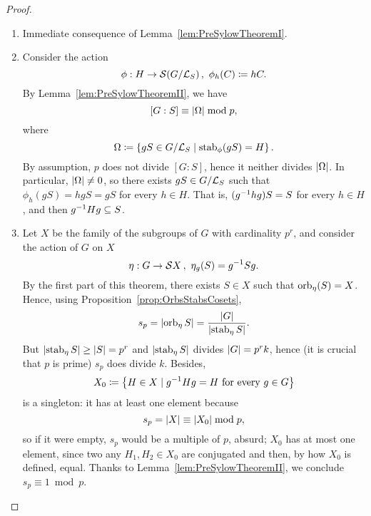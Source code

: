 \begin{proof}
\begin{enumerate}
\item Immediate consequence of Lemma~\ref{lem:PreSylowTheoremI}.
%
\item Consider the action
\[\phi : H \to \mathcal S(G/\mathcal L_S)\,,\ \phi_h (C) \coloneq hC .\]
By Lemma~\ref{lem:PreSylowTheoremII}, we have
\[[G:S] \equiv \left\lvert\Omega\right\rvert \bmod p ,\]
where
\[\Omega \coloneq \left\{gS \in G/\mathcal L_S \mid \operatorname{stab}_\phi (gS) = H\right\} .\]
By assumption, \(p\) does not divide \([G:S]\), hence it neither divides \(\left\lvert\Omega\right\rvert\). In particular, \(\left\lvert\Omega\right\rvert \ne 0\), so there exists \(gS \in G/\mathcal L_S\) such that \(\phi_h(gS) = hgS = gS\) for every \(h \in H\). That is, \((g^{-1} h g) S = S\) for every \(h \in H\), and then \(g^{-1} H g \subseteq S\).
%
\item Let \(X\) be the family of the subgroups of \(G\) with cardinality \(p^r\), and consider the action of \(G\) on \(X\)
\[\eta : G \to \mathcal S X\,, \ \eta_g (S) = g^{-1} S g .\]
By the first part of this theorem, there exists \(S \in X\) such that \(\operatorname{orb}_\eta (S) = X\). Hence, using Proposition~\ref{prop:OrbsStabsCosets},
\[s_p = \left\lvert\operatorname{orb}_\eta S\right\rvert = \frac{\left\lvert G\right\rvert}{\left\lvert\operatorname{stab}_\eta S\right\rvert}.\]
But \(\left\lvert\operatorname{stab}_\eta S\right\rvert \ge \left\lvert S\right\rvert = p^r\) and \(\left\lvert\operatorname{stab}_\eta S\right\rvert\) divides \(\left\lvert G\right\rvert = p^r k\), hence (it is crucial that \(p\) is prime) \(s_p\) does divide \(k\). Besides,
\[X_0 \coloneq \left\{H \in X \mid g^{-1} H g = H \text{ for every } g \in G\right\}\]
is a singleton: it has at least one element because
\[s_p = \left\lvert X\right\rvert \equiv \left\lvert X_0\right\rvert \bmod p ,\]
so if it were empty, \(s_p\) would be a multiple of \(p\), absurd; \(X_0\) has at most one element, since two any \(H_1, H_2 \in X_0\) are conjugated and then, by how \(X_0\) is defined, equal. Thanks to Lemma~\ref{lem:PreSylowTheoremII}, we conclude \(s_p \equiv 1 \bmod p\).\qedhere
\end{enumerate}
\end{proof}
